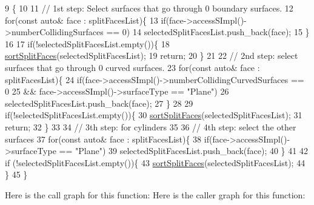 \begin{DoxyCode}
9                                                                                \{
10 
11     \textcolor{comment}{// 1st step: Select surfaces that go through 0 boundary surfaces.}
12     \textcolor{keywordflow}{for}(\textcolor{keyword}{const} \textcolor{keyword}{auto}& face : splitFacesList)\{
13         \textcolor{keywordflow}{if}(face->accessSImpl()->numberCollidingSurfaces == 0)
14             selectedSplitFacesList.push\_back(face);
15     \}
16 
17     \textcolor{keywordflow}{if}(!selectedSplitFacesList.empty())\{
18         \hyperlink{classMcCAD_1_1Decomposition_1_1SplitSurfaces_1_1Impl_ab385ab8a9096d1617a54dd2080956a0a}{sortSplitFaces}(selectedSplitFacesList);
19         \textcolor{keywordflow}{return};
20     \}
21 
22     \textcolor{comment}{// 2nd step: select surfaces that go through 0 curved surfaces.}
23     \textcolor{keywordflow}{for}(\textcolor{keyword}{const} \textcolor{keyword}{auto}& face : splitFacesList)\{
24         \textcolor{keywordflow}{if}(face->accessSImpl()->numberCollidingCurvedSurfaces == 0
25             && face->accessSImpl()->surfaceType == \textcolor{stringliteral}{"Plane"})
26             selectedSplitFacesList.push\_back(face);
27     \}
28 
29     \textcolor{keywordflow}{if}(!selectedSplitFacesList.empty())\{
30         \hyperlink{classMcCAD_1_1Decomposition_1_1SplitSurfaces_1_1Impl_ab385ab8a9096d1617a54dd2080956a0a}{sortSplitFaces}(selectedSplitFacesList);
31         \textcolor{keywordflow}{return};
32     \}
33 
34     \textcolor{comment}{// 3th step: for cylinders}
35 
36     \textcolor{comment}{// 4th step: select the other surfaces}
37     \textcolor{keywordflow}{for}(\textcolor{keyword}{const} \textcolor{keyword}{auto}& face : splitFacesList)\{
38         \textcolor{keywordflow}{if}(face->accessSImpl()->surfaceType == \textcolor{stringliteral}{"Plane"})
39             selectedSplitFacesList.push\_back(face);
40     \}
41 
42     \textcolor{keywordflow}{if} (!selectedSplitFacesList.empty())\{
43         \hyperlink{classMcCAD_1_1Decomposition_1_1SplitSurfaces_1_1Impl_ab385ab8a9096d1617a54dd2080956a0a}{sortSplitFaces}(selectedSplitFacesList);
44     \}
45 \}
\end{DoxyCode}
Here is the call graph for this function\+:
Here is the caller graph for this function\+:
\mbox{\label{classMcCAD_1_1Decomposition_1_1SplitSurfaces_1_1Impl_af59b83cb604949e3efb017a17342f9c5}} 
